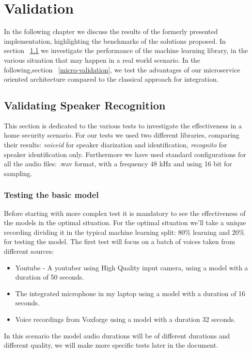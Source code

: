 \chapter{Validation}
\label{chap4}
In the following chapter we discuss the results of the formerly
presented implementation, highlighting the benchmarks of the solutions proposed.
In section ~\ref{speaker-validation} we investigate the performance of the machine learning
library, in the various situation that may happen in a real world scenario. In the following,section ~\ref{micro-validation},
we test the advantages of our microservice oriented architecture compared to the classical approach
for integration.

\section{Validating Speaker Recognition}
\label{speaker-validation}

This section is dedicated to the various tests to investigate
the effectiveness in a home security scenario. For our
tests we used two different libraries, comparing their results:
\textit{voiceid} for speaker diarization and identification, \textit{recognito}
for speaker identification only. Furthermore we have used standard configurations
for all the audio files: .wav format, with a frequency 48 kHz and using 16 bit for sampling.

\subsection{Testing the basic model}
\label{basic}

Before starting with more complex test it is mandatory to see the effectiveness
of the models in the optimal situation. For the optimal situation we'll take
a unique recording dividing it in the typical machine learning split: 80\% learning
and 20\% for testing the model.\newline \pagebreak
The first test will focus on a batch of voices taken from different sources:

\begin{itemize}
    \item Youtube -  A youtuber using High Quality input camera, using a model with a duration of 50 seconds.
    \item The integrated microphone in my laptop using a model with a duration of 16 seconds.
    \item Voice recordings from Voxforge using a model with a duration 32 seconds.
\end{itemize}
In this scenario the model audio durations will be of different durations and different
quality, we will make more specific tests later in the document.

